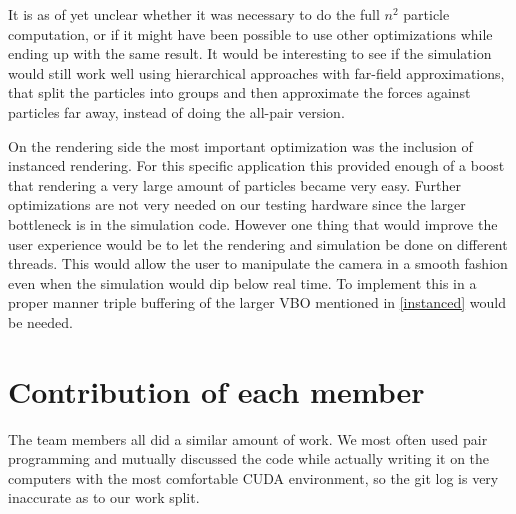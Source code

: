 \documentclass[a4paper]{article}
\begin{document}
It is as of yet unclear whether it was necessary to do the full $n^2$ particle computation, or if it might have been possible to use other optimizations while ending up with the same result.
It would be interesting to see if the simulation would still work well using hierarchical approaches with far-field approximations, that split the particles into groups and then approximate the forces against particles far away, instead of doing the all-pair version.

On the rendering side the most important optimization was the inclusion of instanced rendering.
For this specific application this provided enough of a boost that rendering a very large amount of particles became very easy.
Further optimizations are not very needed on our testing hardware since the larger bottleneck is in the simulation code.
However one thing that would improve the user experience would be to let the rendering and simulation be done on different threads. 
This would allow the user to manipulate the camera in a smooth fashion even when the simulation would dip below real time. 
To implement this in a proper manner triple buffering of the larger VBO mentioned in \ref{instanced} would be needed. 

\section{Contribution of each member}
The team members all did a similar amount of work.
We most often used pair programming and mutually discussed the code while actually writing it on the computers with the most comfortable CUDA environment, so the git log is very inaccurate as to our work split.




\end{document}

